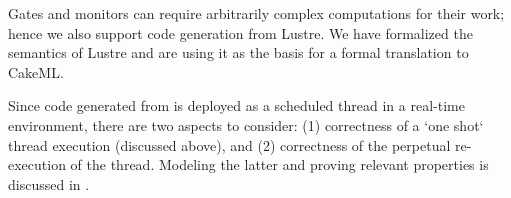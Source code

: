 Gates and monitors can require arbitrarily complex computations for
their work; hence we also support code generation from Lustre. We have
formalized the semantics of Lustre and are using it as the basis for a
formal translation to CakeML.

Since code generated from \splat{} is deployed as a scheduled thread
in a real-time environment, there are two aspects to consider: (1)
correctness of a `one shot` thread execution (discussed above), and
(2) correctness of the perpetual re-execution of the thread.
Modeling the latter and proving relevant properties is discussed in
\cite{johannes:repeat}.

